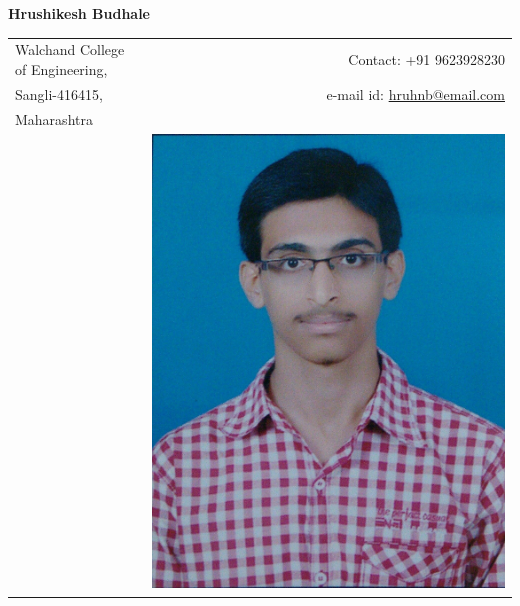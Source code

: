 \documentclass[a4paper,11pt,oneside]{article}
\begin{document}
\noindent\LARGE{\textbf{ Hrushikesh Budhale}}  \\
\vspace{0ex}
\noindent\hrulefill
\normalsize


\begin{center}
\vspace{-3ex}
\begin{tabular}{l r}
Walchand College of Engineering,    & \hspace{2.5in} Contact: +91 9623928230\\
Sangli-416415,                      & \hspace{2.5in} e-mail id: \href{mailto:hruhnb@email.com}{hruhnb@email.com} \\
Maharashtra                         & \\
                                 & \hspace{2.5in} \includegraphics[scale=0.04]{id.jpg} \\
\end{tabular}
\end{center}
\end{document}

